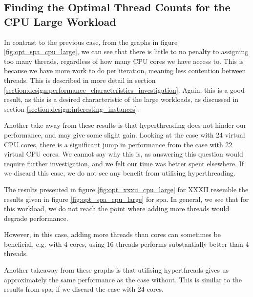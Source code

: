 \subsection{Finding the Optimal Thread Counts for the CPU Large Workload}
\label{section:results:finding_the_optimal_thread_couonts_for_the_cpu_large_workload}

In contrast to the previous case, from the graphs in figure \ref{fig:opt_spa_cpu_large}, we can see that there is little to no penalty to assigning too many threads, regardless of how many CPU cores we have access to. This is because we have more work to do per iteration, meaning less contention between threads. This is described in more detail in section \ref{section:design:performance_characteristics_investigation}. Again, this is a good result, as this is a desired characteristic of the large workloads, as discussed in section \ref{section:design:interesting_instances}.

Another take away from these results is that hyperthreading does not hinder our performance, and may give some slight gain. Looking at the case with 24 virtual CPU cores, there is a significant jump in performance from the case with 22 virtual CPU cores. We cannot say why this is, as answering this question would require further investigation, and we felt our time was better spent elsewhere. If we discard this case, we do not see any benefit from utilising hyperthreading.



The results presented in figure \ref{fig:opt_xxxii_cpu_large} for XXXII resemble the results given in figure \ref{fig:opt_spa_cpu_large} for spa. In general, we see that for this workload, we do not reach the point where adding more threads would degrade performance.

However, in this case, adding more threads than cores can sometimes be beneficial, e.g. with 4 cores, using 16 threads performs substantially better than 4 threads.

Another takeaway from these graphs is that utilising hyperthreads gives us approximately the same performance as the case without. This is similar to the results from spa, if we discard the case with 24 cores.



